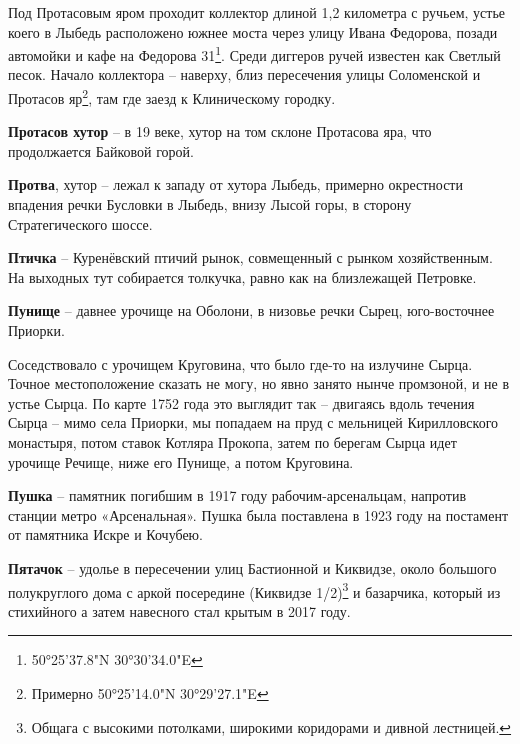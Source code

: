 Под Протасовым яром проходит коллектор длиной 1,2 километра с ручьем, устье коего в Лыбедь расположено южнее моста через улицу Ивана Федорова, позади автомойки и кафе на Федорова 31\footnote{50°25'37.8"N 30°30'34.0"E}. Среди диггеров ручей известен как Светлый песок. Начало коллектора – наверху, близ пересечения улицы Соломенской и Протасов яр\footnote{Примерно 50°25'14.0"N 30°29'27.1"E}, там где заезд к Клиническому городку.\\

\medskip

\textbf{Протасов хутор} – в 19 веке, хутор на том склоне Протасова яра, что продолжается Байковой горой.\\

\medskip

\textbf{Протва}, хутор – лежал к западу от хутора Лыбедь, примерно окрестности впадения речки Бусловки в Лыбедь, внизу Лысой горы, в сторону Стратегического шоссе.\\ 

\medskip

\textbf{Птичка} – Куренёвский птичий рынок, совмещенный с рынком хозяйственным. На выходных тут собирается толкучка, равно как на близлежащей Петровке.\\

\medskip

\textbf{Пунище} – давнее урочище на Оболони, в низовье речки Сырец, юго-восточнее Приорки.

Соседствовало с урочищем Круговина, что было где-то на излучине Сырца. Точное местоположение сказать не могу, но явно занято нынче промзоной, и не в устье Сырца. По карте 1752 года это выглядит так – двигаясь вдоль течения Сырца – мимо села Приорки, мы попадаем на пруд с мельницей Кирилловского монастыря, потом ставок Котляра Прокопа, затем по берегам Сырца идет урочище Речище, ниже его Пунище, а потом Круговина.\\

\medskip

\textbf{Пушка} – памятник погибшим в 1917 году рабочим-арсенальцам, напротив станции метро «Арсенальная». Пушка была поставлена в 1923 году на постамент от памятника Искре и Кочубею.\\

\medskip

\textbf{Пятачок} – удолье в пересечении улиц Бастионной и Киквидзе, около большого полукруглого дома с аркой посередине (Киквидзе 1/2)\footnote{Общага с высокими потолками,  широкими коридорами и дивной лестницей.} и базарчика, который из стихийного а затем навесного стал крытым в 2017 году.

